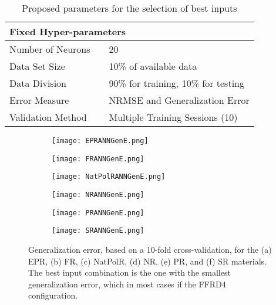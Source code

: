 \begin{table}[htbp!]
    \centering
    \caption{Proposed parameters for the selection of best inputs}
    \begin{tabular}{l m{1cm} l}
    \toprule
    \multicolumn{3}{l}{Fixed Hyper-parameters} \\
    \hline
    Number of Neurons           & & 20 \\
    Data Set Size               & & 10\% of available data\\
    Data Division               & & 90\% for training, 10\% for testing\\
    Error Measure               & & NRMSE and Generalization Error\\
    Validation Method           & & Multiple Training Sessions (10)\\
    \bottomrule
    \end{tabular}
    \label{tbl:ANN_InputSelParameters}
\end{table}

\begin{figure}[htbp!]
	\centering
    \begin{subfigure}[b]{0.49\textwidth}
        \centering
        \texttt{[image: EPRANNGenE.png]}
        \caption{}
        \label{fig:ANNGenEPR}
    \end{subfigure}
    \begin{subfigure}[b]{0.49\textwidth}
        \centering
        \texttt{[image: FRANNGenE.png]}
        \caption{}
        \label{fig:ANNGenFR}
    \end{subfigure}
    \begin{subfigure}[b]{0.49\textwidth}
        \centering
        \texttt{[image: NatPolRANNGenE.png]}
        \caption{}
        \label{fig:ANNGenNR}
    \end{subfigure}
    \begin{subfigure}[b]{0.49\textwidth}
        \centering
        \texttt{[image: NRANNGenE.png]}
        \caption{}
        \label{fig:ANNGenNatPolR}
    \end{subfigure}
    \begin{subfigure}[b]{0.49\textwidth}
        \centering
        \texttt{[image: PRANNGenE.png]}
        \caption{}
        \label{fig:ANNGenPR}
    \end{subfigure}
    \begin{subfigure}[b]{0.49\textwidth}
        \centering
        \texttt{[image: SRANNGenE.png]}
        \caption{}
        \label{fig:ANNGenSR}
    \end{subfigure}
    \caption{Generalization error, based on a 10-fold cross-validation, for the (a) EPR, (b) FR, (c) NatPolR, (d) NR, (e) PR, and (f) SR materials. The best input combination is the one with the smallest generalization error, which in most cases if the FFRD4 configuration.}
    \label{fig:ANNGen4}
\end{figure}


